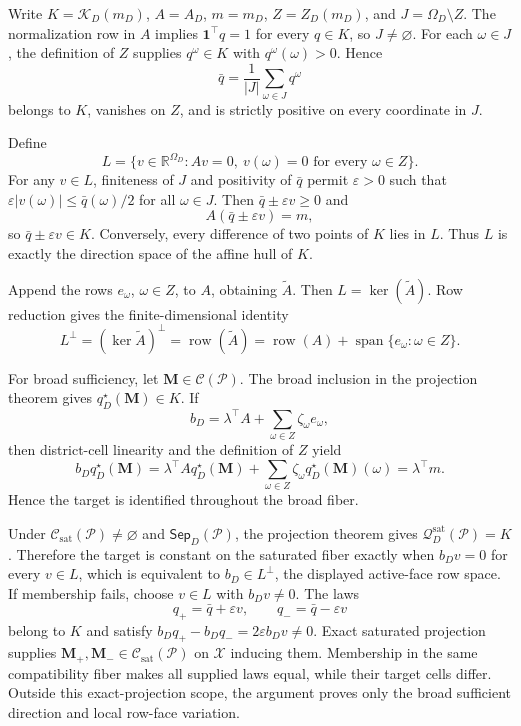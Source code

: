 Write \(K=\mathcal K_D(m_D)\), \(A=A_D\), \(m=m_D\), \(Z=Z_D(m_D)\), and \(J=\Omega_D\setminus Z\).  The normalization row in \(A\) implies \(\mathbf 1^\top q=1\) for every \(q\in K\), so \(J\ne\varnothing\).  For each \(\omega\in J\), the definition of \(Z\) supplies \(q^\omega\in K\) with \(q^\omega(\omega)>0\).  Hence
\[
\bar q=\frac1{|J|}\sum_{\omega\in J}q^\omega
\]
belongs to \(K\), vanishes on \(Z\), and is strictly positive on every coordinate in \(J\).

Define
\[
L=\{v\in\mathbb R^{\Omega_D}:Av=0,\ v(\omega)=0\text{ for every }\omega\in Z\}.
\]
For any \(v\in L\), finiteness of \(J\) and positivity of \(\bar q\) permit \(\varepsilon>0\) such that \(\varepsilon|v(\omega)|\leq\bar q(\omega)/2\) for all \(\omega\in J\).  Then \(\bar q\pm\varepsilon v\geq0\) and
\[
A(\bar q\pm\varepsilon v)=m,
\]
so \(\bar q\pm\varepsilon v\in K\).  Conversely, every difference of two points of \(K\) lies in \(L\).  Thus \(L\) is exactly the direction space of the affine hull of \(K\).

Append the rows \(e_\omega\), \(\omega\in Z\), to \(A\), obtaining \(\widetilde A\).  Then \(L=\ker(\widetilde A)\).  Row reduction gives the finite-dimensional identity
\[
L^\perp=(\ker\widetilde A)^\perp
=\operatorname{row}(\widetilde A)
=\operatorname{row}(A)+\operatorname{span}\{e_\omega:\omega\in Z\}.
\]

For broad sufficiency, let \(\mathbf M\in\mathcal C(\mathcal P)\).  The broad inclusion in the projection theorem gives \(q_D^\star(\mathbf M)\in K\).  If
\[
b_D=\lambda^\top A+\sum_{\omega\in Z}\zeta_\omega e_\omega,
\]
then district-cell linearity and the definition of \(Z\) yield
\[
b_Dq_D^\star(\mathbf M)
=\lambda^\top Aq_D^\star(\mathbf M)
 +\sum_{\omega\in Z}\zeta_\omega q_D^\star(\mathbf M)(\omega)
=\lambda^\top m.
\]
Hence the target is identified throughout the broad fiber.

Under \(\mathcal C_{\mathrm{sat}}(\mathcal P)\ne\varnothing\) and \(\mathsf{Sep}_D(\mathcal P)\), the projection theorem gives \(\mathcal Q_D^{\mathrm{sat}}(\mathcal P)=K\).  Therefore the target is constant on the saturated fiber exactly when \(b_Dv=0\) for every \(v\in L\), which is equivalent to \(b_D\in L^\perp\), the displayed active-face row space.  If membership fails, choose \(v\in L\) with \(b_Dv\ne0\).  The laws
\[
q_+=\bar q+\varepsilon v,
\qquad q_-=\bar q-\varepsilon v
\]
belong to \(K\) and satisfy \(b_Dq_+-b_Dq_-=2\varepsilon b_Dv\ne0\).  Exact saturated projection supplies \(\mathbf M_+,\mathbf M_-\in\mathcal C_{\mathrm{sat}}(\mathcal P)\) on \(\mathcal X\) inducing them.  Membership in the same compatibility fiber makes all supplied laws equal, while their target cells differ.  Outside this exact-projection scope, the argument proves only the broad sufficient direction and local row-face variation.